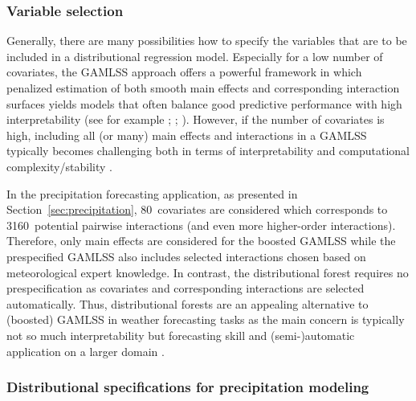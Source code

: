\documentclass[aoas, preprint]{imsart}
\numberwithin{equation}{subsection}
\begin{document}
\subsubsection*{Variable selection}

Generally, there are many possibilities how to specify the variables that are
to be included in a distributional regression model. Especially for a low number
of covariates, the GAMLSS approach offers a powerful framework in which
penalized estimation of both smooth main effects and corresponding interaction surfaces
yields models that often balance good predictive performance with high
interpretability (see for example \citealp{Wood+Scheipl+Faraway:2013}; 
\citealp{Goicoa+Adin+Ugarte:2018}; \citealp{Ugarte+Adin+Goicoa:2017}).
However, if the number of covariates is high, including all (or many)
main effects and interactions in a GAMLSS typically becomes challenging both in terms
of interpretability and computational complexity/stability
\citep[see also][]{Hofner+Mayr+Schmid:2016}.

In the precipitation forecasting application, as presented in 
Section~\ref{sec:precipitation}, 80~covariates are considered which corresponds 
to 3160~potential pairwise interactions (and even more higher-order interactions). 
Therefore, only main effects are considered for the boosted GAMLSS while
the prespecified GAMLSS also includes selected interactions chosen based on
meteorological expert knowledge. In contrast, the distributional forest requires no
prespecification as covariates and corresponding interactions are selected automatically.
Thus, distributional forests are an appealing alternative to (boosted) GAMLSS
in weather forecasting tasks as the main concern is typically not so much
interpretability but forecasting skill and (semi-)automatic application on a
larger domain \citep[see also the discussion in][]{Rasp+Lerch:2018}.


\subsubsection*{Distributional specifications for precipitation modeling}
\end{document}
